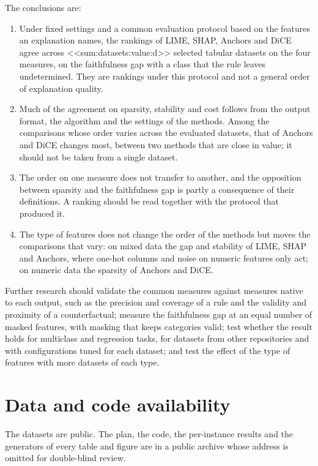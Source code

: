 \documentclass[10pt,a4paper,twocolumn]{article}
\newcommand{\paperfarchive}{\url{https://doi.org/10.5281/zenodo.23325483}}
\newif\iffull
\begin{document}
The conclusions are:
\begin{enumerate}
\setlength{\itemsep}{0pt}
\item Under fixed settings and a common evaluation protocol based on the features an
explanation names, the rankings of LIME, SHAP, Anchors and DiCE agree across
<<sum:datasets:value:d>> selected tabular datasets on the four measures, on the
faithfulness gap with a class that the rule leaves undetermined. They are rankings under
this protocol and not a general order of explanation quality.
\item Much of the agreement on sparsity, stability and cost follows from the output
format, the algorithm and the settings of the methods. Among the comparisons whose order
varies across the evaluated datasets, that of Anchors and DiCE changes most, between two
methods that are close in value; it should not be taken from a single dataset.
\item The order on one measure does not transfer to another, and the opposition between
sparsity and the faithfulness gap is partly a consequence of their definitions. A ranking
should be read together with the protocol that produced it.
\item The type of features does not change the order of the methods but moves the
comparisons that vary: on mixed data the gap and stability of LIME, SHAP and Anchors, where
one-hot columns and noise on numeric features only act; on numeric data the sparsity of
Anchors and DiCE.
\end{enumerate}
Further research should validate the common measures against measures native to each
output, such as the precision and coverage of a rule and the validity and proximity of a
counterfactual; measure the faithfulness gap at an equal number of masked features, with
masking that keeps categories valid; test whether the result holds for multiclass and
regression tasks, for datasets from other repositories and with configurations tuned for
each dataset; and test the effect of the type of features with more datasets of each
type.

\section*{Data and code availability}
\iffull
The datasets are public (OpenML). The plan, the code, the per-instance results and the
generators of every table and figure are at
\url{https://github.com/jonnabio/xai-eval-framework}, archived at \paperfarchive.
\else
The datasets are public. The plan, the code, the per-instance results and the generators
of every table and figure are in a public archive whose address is omitted for
double-blind review.
\fi
\end{document}
